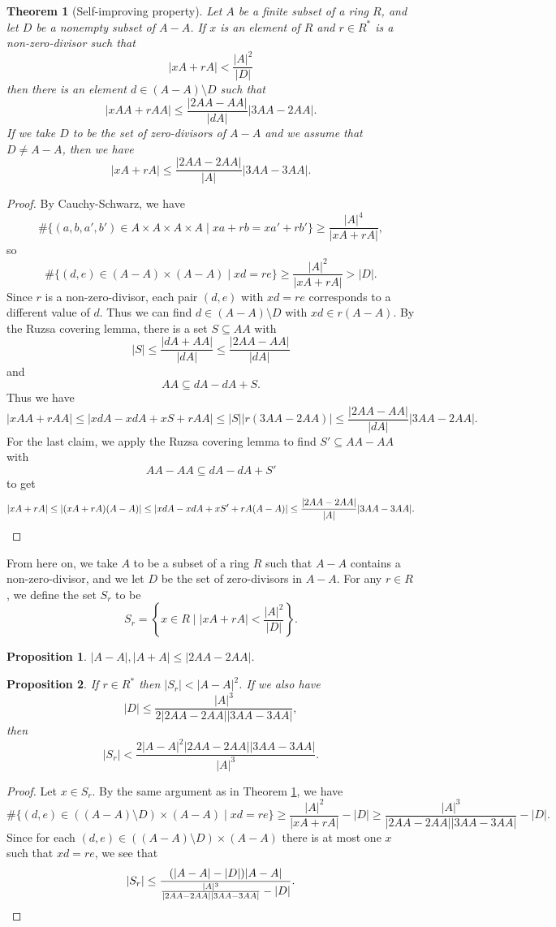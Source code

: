 \documentclass[letterpaper,11pt]{article}
\newtheorem{thm}{Theorem}
\newtheorem{prop}{Proposition}
\theoremstyle{definition}
\theoremstyle{remark}
\begin{document}
\begin{thm}[Self-improving property]\label{self-improving} Let $A$ be a finite subset of a ring $R$, and let $D$ be a nonempty subset of $A-A$. If $x$ is an element of $R$ and $r\in R^*$ is a non-zero-divisor such that
\[
|xA+rA| < \frac{|A|^2}{|D|}
\]
then there is an element $d \in (A-A)\setminus D$ such that
\[
|xAA+rAA| \le \frac{|2AA-AA|}{|dA|}|3AA-2AA|.
\]
If we take $D$ to be the set of zero-divisors of $A-A$ and we assume that $D \ne A-A$, then we have
\[
|xA+rA| \le \frac{|2AA-2AA|}{|A|}|3AA-3AA|.
\]
\end{thm}
\begin{proof} By Cauchy-Schwarz, we have
\[
\#\{(a,b,a',b')\in A\times A\times A\times A \mid xa+rb = xa'+rb'\} \ge \frac{|A|^4}{|xA+rA|},
\]
so
\[
\#\{(d,e)\in (A-A)\times (A-A) \mid xd = re\} \ge \frac{|A|^2}{|xA+rA|} > |D|.
\]
Since $r$ is a non-zero-divisor, each pair $(d,e)$ with $xd = re$ corresponds to a different value of $d$. Thus we can find $d \in (A-A)\setminus D$ with $xd\in r(A-A)$. By the Ruzsa covering lemma, there is a set $S \subseteq AA$ with
\[
|S| \le \frac{|dA+AA|}{|dA|} \le \frac{|2AA-AA|}{|dA|}
\]
and
\[
AA \subseteq dA-dA+S.
\]
Thus we have
\[
|xAA+rAA| \le |xdA-xdA+xS+rAA| \le |S||r(3AA-2AA)| \le \frac{|2AA-AA|}{|dA|}|3AA-2AA|.
\]
For the last claim, we apply the Ruzsa covering lemma to find $S' \subseteq AA-AA$ with
\[
AA-AA \subseteq dA-dA+S'
\]
to get
\[
|xA+rA| \le |(xA+rA)(A-A)| \le |xdA-xdA+xS'+rA(A-A)| \le \frac{|2AA-2AA|}{|A|}|3AA-3AA|.\qedhere
\]
\end{proof}

From here on, we take $A$ to be a subset of a ring $R$ such that $A-A$ contains a non-zero-divisor, and we let $D$ be the set of zero-divisors in $A-A$. For any $r \in R$, we define the set $S_r$ to be
\[
S_r = \left\{x \in R \mid |xA+rA| < \frac{|A|^2}{|D|}\right\}.
\]

\begin{prop} $|A-A|, |A+A| \le |2AA-2AA|$.
\end{prop}

\begin{prop} If $r \in R^*$ then $|S_r| < |A-A|^2$. If we also have
\[
|D| \le \frac{|A|^3}{2|2AA-2AA||3AA-3AA|},
\]
then
\[
|S_r| < \frac{2|A-A|^2|2AA-2AA||3AA-3AA|}{|A|^3}.
\]
\end{prop}
\begin{proof} Let $x \in S_r$. By the same argument as in Theorem \ref{self-improving}, we have
\[
\#\{(d,e)\in ((A-A)\setminus D)\times (A-A) \mid xd = re\} \ge \frac{|A|^2}{|xA+rA|} - |D| \ge \frac{|A|^3}{|2AA-2AA||3AA-3AA|} - |D|.
\]
Since for each $(d,e) \in ((A-A)\setminus D)\times (A-A)$ there is at most one $x$ such that $xd = re$, we see that
\[
|S_r| \le \frac{(|A-A|-|D|)|A-A|}{\frac{|A|^3}{|2AA-2AA||3AA-3AA|} - |D|}.\qedhere
\]
\end{proof}
\end{document}
